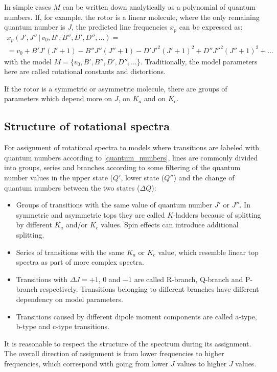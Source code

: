 \documentclass[11pt]{article}
\begin{document}
In simple cases $M$ can be written down analytically as a polynomial of quantum numbers. If, for example, the rotor is a linear molecule, where the only remaining quantum number is $J$, the predicted line frequencies $x_p$ can be expressed as:
\begin{multline}
\label{linear_eigenvalues}
x_p(J', J''\, |\, v_0, B', B'', D', D'', ...) = \\
= v_0 + B'J'(J'+1) - B''J''(J''+1) - D'{J'}^2(J'+1)^2 + D''{J''}^2(J''+1)^2 + ... 
\end{multline}
with the model $M = \{v_0, B', B'', D', D'', ...\}$. Traditionally, the model parameters here are called rotational constants and distortions.

If the rotor is a symmetric or asymmetric molecule, there are groups of parameters which depend more on $J$, on $K_a$ and on $K_c$.

\subsection{Structure of rotational spectra}

For assignment of rotational spectra to models where transitions are labeled with quantum numbers according to \ref{quantum_numbers}, lines are commonly divided into  groups, series and branches according to some filtering of the quantum number values in the upper state ($Q'$, lower state ($Q''$) and the change of quantum numbers between the two states ($\Delta Q$):
\begin{itemize}
	\item Groups of transitions with the same value of quantum number $J'$ or $J''$. In symmetric and asymmetric tops they are called $K$-ladders because of splitting by different $K_a$ and/or $K_c$ values. Spin effects can introduce additional splitting.  
	\item Series of transitions with the same $K_a$ or $K_c$ value, which resemble linear top spectra as part of more complex spectra.
	\item Transitions with $\Delta J = +1$, $0$ and $-1$ are called R-branch, Q-branch and P-branch respectively. Transitions belonging to different branches have different dependency on model parameters.
	\item Transitions caused by different dipole moment components are called a-type, b-type and c-type transitions. 
\end{itemize}


It is reasonable to respect the structure of the spectrum during its assignment. The overall direction of assignment is from lower frequencies to higher frequencies, which correspond with going from lower $J$ values to higher $J$ values. 
\end{document}
